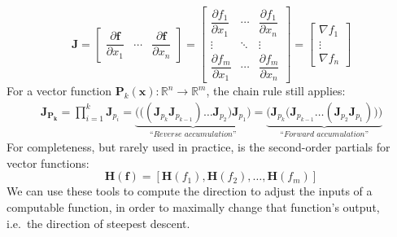 \documentclass[12pt,initial,twoside,maitrise]{dms}
\numberwithin{equation}{section}
\numberwithin{table}{chapter}
\numberwithin{figure}{chapter}
\begin{document}
%
\begin{equation}
\mathbf J = \begin{bmatrix}
                       \dfrac{\partial \mathbf{f}}{\partial x_1} & \cdots & \dfrac{\partial \mathbf{f}}{\partial x_n} \end{bmatrix}
= \begin{bmatrix}
      \dfrac{\partial f_1}{\partial x_1} & \cdots & \dfrac{\partial f_1}{\partial x_n}\\
      \vdots & \ddots & \vdots\\
      \dfrac{\partial f_m}{\partial x_1} & \cdots & \dfrac{\partial f_m}{\partial x_n} \end{bmatrix}
    = \begin{bmatrix}
          \nabla f_1 \\
          \vdots \\
          \nabla f_n \end{bmatrix}
\end{equation}
%
For a vector function $\mathbf{P}_k(\mathbf{x}): \mathbb{R}^n\rightarrow\mathbb{R}^m$, the chain rule still applies:
%
\begin{align*}
\mathbf{J}_\mathbf{P_k} = \displaystyle \prod_{i=1}^{k} \mathbf{J}_{p_i} = \underbrace{\bigg(\Big((\mathbf{J}_{p_k} \mathbf{J}_{p_{k-1}}) \dots \mathbf{J}_{p_2}\Big) \mathbf{J}_{p_1}\bigg)}_{\textit{``Reverse accumulation''}} = \underbrace{\bigg(\mathbf{J}_{p_k} \Big(\mathbf{J}_{p_{k-1}} \dots (\mathbf{J}_{p_2} \mathbf{J}_{p_1})\Big)\bigg)}_{\textit{``Forward accumulation''}}
\end{align*}
%
For completeness, but rarely used in practice, is the second-order partials for vector functions:
%
\begin{equation}
\mathbf{H} (\mathbf {f} )=[\mathbf {H} (f_{1}), \mathbf {H} (f_{2}), \dots, \mathbf {H} (f_{m})]
\end{equation}
%
We can use these tools to compute the direction to adjust the inputs of a computable function, in order to maximally change that function's output, i.e.\ the direction of steepest descent.
\end{document}
